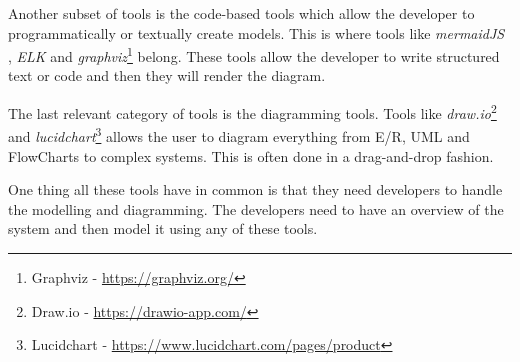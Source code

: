 Another subset of tools is the code-based tools which allow the developer to programmatically or textually create models. This is where tools like \emph{mermaidJS} \cite{mermaid}, \emph{ELK} \cite{ELK} and \emph{graphviz}\footnote{Graphviz - \url{https://graphviz.org/}} belong.
These tools allow the developer to write structured text or code and then they will render the diagram.

The last relevant category of tools is the diagramming tools. Tools like \emph{draw.io}\footnote{Draw.io - \url{https://drawio-app.com/}} and \emph{lucidchart}\footnote{Lucidchart - \url{https://www.lucidchart.com/pages/product}} allows the user to diagram everything from E/R, UML and FlowCharts to complex systems.
This is often done in a drag-and-drop fashion.

One thing all these tools have in common is that they need developers to handle the modelling and diagramming. The developers need to have an overview of the system and then model it using any of these tools.
\clearpage